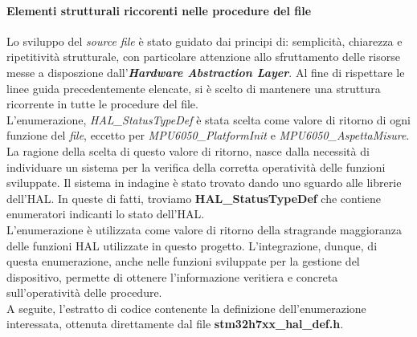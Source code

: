 \documentclass[11pt]{report}
\begin{document}
\paragraph{Elementi strutturali riccorenti nelle procedure del file}
Lo sviluppo del \textit{source file} è stato guidato dai principi di: semplicità, chiarezza e ripetitività strutturale, con particolare attenzione allo sfruttamento delle risorse messe a disposzione dall'\textbf{\textit{Hardware Abstraction Layer}}.
Al fine di rispettare le linee guida precedentemente elencate, si è scelto di mantenere una struttura ricorrente in tutte le procedure del file.\\
L'enumerazione, \textit{HAL\_StatusTypeDef} è stata scelta come valore di ritorno di ogni funzione del \textit{file}, eccetto per \textit{MPU6050\_PlatformInit} e \textit{MPU6050\_AspettaMisure}.
La ragione della scelta di questo valore di ritorno, nasce dalla necessità di individuare un sistema per la verifica della corretta operatività delle funzioni sviluppate. Il sistema in indagine è stato trovato dando uno sguardo alle librerie dell'HAL.
In queste di fatti, troviamo \textbf{HAL\_StatusTypeDef} che contiene enumeratori indicanti lo stato dell'HAL.\\
L'enumerazione è utilizzata come valore di ritorno della stragrande maggioranza delle funzioni HAL utilizzate in questo progetto. L'integrazione, dunque, di questa enumerazione, anche nelle funzioni sviluppate per la gestione del dispositivo, permette di ottenere 
l'informazione veritiera e concreta sull'operatività delle procedure.\\
A seguite, l'estratto di codice contenente la definizione dell'enumerazione interessata, ottenuta direttamente dal file \textbf{stm32h7xx\_hal\_def.h}.

\newpage

\end{document}
